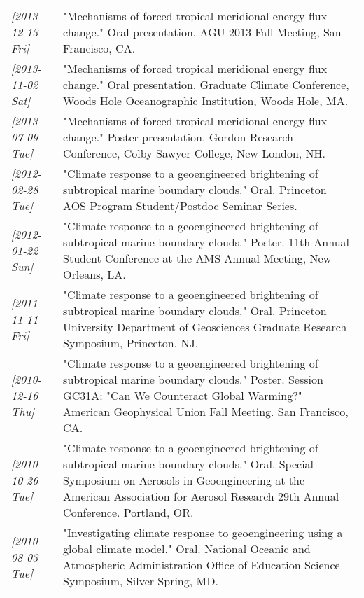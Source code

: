 \documentclass[12pt,letterpaper]{shillcv}
\begin{document}
\begin{center}
\begin{tabularx}{\textwidth}{lX}
\textit{[2013-12-13 Fri]} & "Mechanisms of forced tropical meridional energy flux change."  Oral presentation.  AGU 2013 Fall Meeting, San Francisco, CA.\\
\textit{[2013-11-02 Sat]} & "Mechanisms of forced tropical meridional energy flux change."  Oral presentation.  Graduate Climate Conference, Woods Hole Oceanographic Institution, Woods Hole, MA.\\
\textit{[2013-07-09 Tue]} & "Mechanisms of forced tropical meridional energy flux change."  Poster presentation.  Gordon Research Conference, Colby-Sawyer College, New London, NH.\\
\textit{[2012-02-28 Tue]} & "Climate response to a geoengineered brightening of subtropical marine boundary clouds."  Oral.  Princeton AOS Program Student/Postdoc Seminar Series.\\
\textit{[2012-01-22 Sun]} & "Climate response to a geoengineered brightening of subtropical marine boundary clouds."  Poster.  11th Annual Student Conference at the AMS Annual Meeting, New Orleans, LA.\\
\textit{[2011-11-11 Fri]} & "Climate response to a geoengineered brightening of subtropical marine boundary clouds."  Oral.  Princeton University Department of Geosciences Graduate Research Symposium, Princeton, NJ.\\
\textit{[2010-12-16 Thu]} & "Climate response to a geoengineered brightening of subtropical marine boundary clouds."  Poster.  Session GC31A: "Can We Counteract Global Warming?" American Geophysical Union Fall Meeting.  San Francisco, CA.\\
\textit{[2010-10-26 Tue]} & "Climate response to a geoengineered brightening of subtropical marine boundary clouds."  Oral.  Special Symposium on Aerosols in Geoengineering at the American Association for Aerosol Research 29th Annual Conference.  Portland, OR.\\
\textit{[2010-08-03 Tue]} & "Investigating climate response to geoengineering using a global climate model."  Oral.  National Oceanic and Atmospheric Administration Office of Education Science Symposium, Silver Spring, MD.\\
\end{tabularx}
\end{center}
\end{document}
